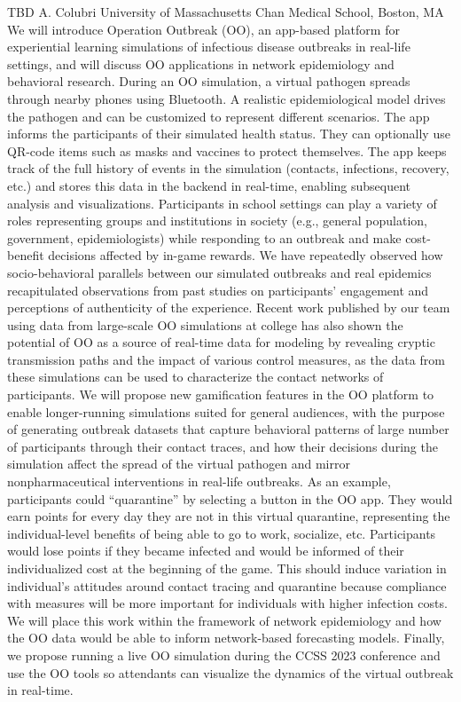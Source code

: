 
    \begin{abstract_online}{TBD}{%
        A. Colubri}{%
        }{%
        University of Massachusetts Chan Medical School, Boston, MA}
    We will introduce Operation Outbreak (OO), an app-based platform for experiential learning simulations of infectious disease outbreaks in real-life settings, and will discuss OO applications in network epidemiology and behavioral research. During an OO simulation, a virtual pathogen spreads through nearby phones using Bluetooth. A realistic epidemiological model drives the pathogen and can be customized to represent different scenarios. The app informs the participants of their simulated health status. They can optionally use QR-code items such as masks and vaccines to protect themselves. The app keeps track of the full history of events in the simulation (contacts, infections, recovery, etc.) and stores this data in the backend in real-time, enabling subsequent analysis and visualizations. Participants in school settings can play a variety of roles representing groups and institutions in society (e.g., general population, government, epidemiologists) while responding to an outbreak and make cost-benefit decisions affected by in-game rewards. We have repeatedly observed how socio-behavioral parallels between our simulated outbreaks and real epidemics recapitulated observations from past studies on participants’ engagement and perceptions of authenticity of the experience. Recent work published by our team using data from large-scale OO simulations at college has also shown the potential of OO as a source of real-time data for modeling by revealing cryptic transmission paths and the impact of various control measures, as the data from these simulations can be used to characterize the contact networks of participants. We will propose new gamification features in the OO platform to enable longer-running simulations suited for general audiences, with the purpose of generating outbreak datasets that capture behavioral patterns of large number of participants through their contact traces, and how their decisions during the simulation affect the spread of the virtual pathogen and mirror nonpharmaceutical interventions in real-life outbreaks. As an example, participants could “quarantine” by selecting a button in the OO app. They would earn points for every day they are not in this virtual quarantine, representing the individual-level benefits of being able to go to work, socialize, etc. Participants would lose points if they became infected and would be informed of their individualized cost at the beginning of the game. This should induce variation in individual’s attitudes around contact tracing and quarantine because compliance with measures will be more important for individuals with higher infection costs. We will place this work within the framework of network epidemiology and how the OO data would be able to inform network-based forecasting models. Finally, we propose running a live OO simulation during the CCSS 2023 conference and use the OO tools so attendants can visualize the dynamics of the virtual outbreak in real-time. 
    
    \end{abstract_online}
    